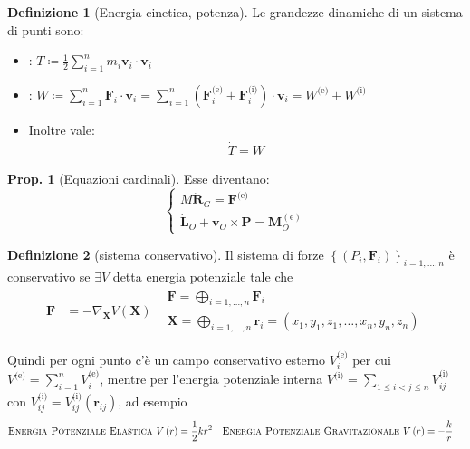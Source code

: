 \documentclass[a4paper,10pt]{article}
\theoremstyle{definition}
\newcommand{\bv}{\boldsymbol} %
\theoremstyle{indentdefinition}
\newtheorem{defn}{Definizione}[section]
\theoremstyle{indenttheorem}
\newtheorem{prop}{Prop.}
\theoremstyle{myremark}
\theoremstyle{indentgeneral}
\begin{document}
\begin{defn}[Energia cinetica, potenza] Le grandezze dinamiche di un sistema di punti sono:
\begin{itemize}
    \item {}: $T  \coloneqq\frac{1}{2}\sum_{i=1}^{n}m_{i}\boldsymbol{v}_{i}\cdot\boldsymbol{v}_{i}$
    \item {}: $W   \coloneqq\sum_{i=1}^{n}\boldsymbol{F}_{i}\cdot\boldsymbol{v}_{i}=\sum_{i=1}^{n}\left(\boldsymbol{F}_{i}^{\text{(e)}}+\boldsymbol{F}_{i}^{\text{(i)}}\right)\cdot\boldsymbol{v}_{i}=W^{\text{(e)}}+W^{\text{(i)}}$
    \item Inoltre vale: 
    \begin{align}
  \dot{T}=W\label{eq:energia-cinetica-potenza-sistema}
\end{align}
\end{itemize} 
\end{defn}



\begin{prop}[Equazioni cardinali] Esse diventano:
$$\begin{cases}
    M\ddot{\boldsymbol{R}}_{G}=\boldsymbol{F}^{\text{(e)}} \\
    \dot{\bv{L}}_O+\bv{v}_O\times\bv{P}=\bv{M}_O^{(\text{e})}
\end{cases}$$
    
\end{prop}

\begin{defn}[sistema conservativo]
\label{def:sistema-conservativo}Il sistema di forze $\left\{ \left(P_{i},\boldsymbol{F}_{i}\right)\right\} _{i=1,\ldots,n}$
è conservativo se $\exists V$ detta energia potenziale tale che
\begin{align*}
\boldsymbol{F} & =-\nabla_{\boldsymbol{X}}V\left(\boldsymbol{X}\right) & \begin{array}{l}
\boldsymbol{F}=\bigoplus_{i=1,\ldots,n}\boldsymbol{F}_{i}\\
\boldsymbol{X}=\bigoplus_{i=1,\ldots,n}\boldsymbol{r}_{i}=\left(x_{1},y_{1},z_{1},\dots,x_{n},y_{n},z_{n}\right)
\end{array}
\end{align*}

Quindi per ogni punto c'è un campo conservativo esterno $V_{i}^{\text{(e)}}$
per cui $V^{\text{(e)}}=\sum_{i=1}^{n}V_{i}^{\text{(e)}}$, mentre
per l'energia potenziale interna $V^{\text{(i)}}=\sum_{1\leq i<j\leq n}V_{ij}^{\text{(i)}}$
con $V_{ij}^{\text{(i)}}=V_{ij}^{\text{(i)}}\left(\boldsymbol{r}_{ij}\right)$,
ad esempio
\begin{align*}
\text{\textsc{Energia Potenziale Elastica }} & V\left(r\right)=\frac{1}{2}kr^{2} & \text{\textsc{Energia Potenziale Gravitazionale }} & V\left(r\right)=-\frac{k}{r}
\end{align*}
\end{defn}
\end{document}
